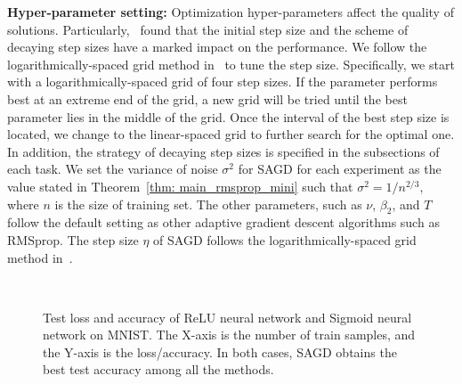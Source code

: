 \documentclass[11pt]{article}
\begin{document}
\vspace{0.05in}
\textbf{Hyper-parameter setting:} Optimization hyper-parameters affect the quality of solutions. Particularly,~\citet{wiro17} found that the initial step size and the scheme of decaying step sizes have a marked impact on the performance. We follow the logarithmically-spaced grid method in~\citet{wiro17} to tune the step size. Specifically, we start with a logarithmically-spaced grid of four step sizes. If the parameter performs best at an extreme end of the grid, a new grid will be tried until the best parameter lies in the middle of the grid. Once the interval of the best step size is located, we change to the linear-spaced grid to further search for the optimal one. %
In addition, the strategy of decaying step sizes is specified in the subsections of each task. 
We set the variance of noise $\sigma^2$ for \textsc{SAGD} for each experiment as the value stated in Theorem~\ref{thm: main_rmsprop_mini} such that $\sigma^2 = 1/n^{2/3}$, where $n$ is the size of training set. The other parameters, such as $\nu$, $\beta_2$, and $T$ follow the default setting as other adaptive gradient descent algorithms such as RMSprop. The step size $\eta$ of \textsc{SAGD} follows the logarithmically-spaced grid method in~\citet{wiro17}.



\begin{figure}[t!]
\mbox{
\hspace{-0.2in}
 }
 \caption[]{Test loss and accuracy of ReLU neural network and Sigmoid neural network on MNIST. The X-axis is the number of train samples, and the Y-axis is the loss/accuracy. In both cases, \textsc{SAGD} obtains the best test accuracy among all the methods.} 
 \label{fig:mnist}
\end{figure}
\end{document}
